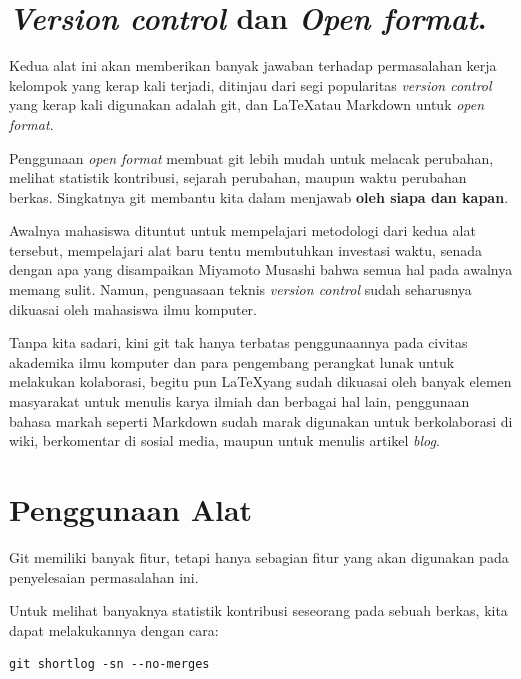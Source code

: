 \documentclass[a4paper,11pt]{article}
\begin{document}
\section{\emph{Version control}\cite{wiki-git} dan \emph{Open format}\cite{wiki-of}.}
\label{sec:org3d84a5f}

Kedua alat ini akan memberikan banyak jawaban terhadap permasalahan
kerja kelompok yang kerap kali terjadi, ditinjau dari segi popularitas
\emph{version control} yang kerap kali digunakan adalah git, dan
\LaTeX atau Markdown untuk \emph{open format}.

Penggunaan \emph{open format} membuat git lebih mudah untuk melacak
perubahan, melihat statistik kontribusi, sejarah perubahan, maupun
waktu perubahan berkas. Singkatnya git membantu kita dalam menjawab
\textbf{oleh siapa dan kapan}.

Awalnya mahasiswa dituntut untuk mempelajari metodologi dari kedua
alat tersebut, mempelajari alat baru tentu membutuhkan investasi
waktu, senada dengan apa yang disampaikan Miyamoto
Musashi\cite{wiki-musashi} bahwa semua hal pada awalnya memang
sulit. Namun, penguasaan teknis \emph{version control} sudah
seharusnya dikuasai oleh mahasiswa ilmu komputer\cite{might}.

Tanpa kita sadari, kini git tak hanya terbatas penggunaannya pada
civitas akademika ilmu komputer dan para pengembang perangkat lunak
untuk melakukan kolaborasi, begitu pun \LaTeX yang sudah dikuasai oleh
banyak elemen masyarakat untuk menulis karya ilmiah dan berbagai hal
lain, penggunaan bahasa markah seperti Markdown sudah marak digunakan
untuk berkolaborasi di wiki, berkomentar di sosial media, maupun untuk
menulis artikel \emph{blog}.


\section{Penggunaan Alat}
\label{sec:org72910a8}

Git memiliki banyak fitur, tetapi hanya sebagian fitur yang akan
digunakan pada penyelesaian permasalahan ini.

Untuk melihat banyaknya statistik kontribusi seseorang pada sebuah
berkas, kita dapat melakukannya dengan cara:

\begin{verbatim}
git shortlog -sn --no-merges
\end{verbatim}
\end{document}
